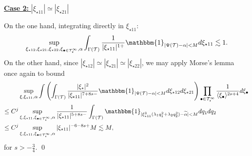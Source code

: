 \documentclass[%
11pt,  reqno]{amsart}
\newcommand{\5}{\textup{V}}
\newcommand{\noi}{\noindent}
\newcommand{\wt}{\widetilde}
\theoremstyle{remark}
\newcommand{\bul}{\bullet}
\newcommand{\TT}{\mathcal{T}}
\newcommand{\G}{\Gamma}
\newcommand{\ld}{\lambda}
\newcommand{\jb}[1]
{\langle #1 \rangle}
\numberwithin{equation}{section}
\numberwithin{theorem}{section}
\begin{document}
\smallskip
\noi
\underline{\textbf{Case 2:} $|\xi_{\star11}| \simeq |\xi_{\star21}|$}


 On the one hand, integrating directly in $\xi_{\star11}$:
\begin{align*} 
\sup_{\xi_{\star12}, \xi_{\star21}, \xi_{\star22},  \xi_{\bul\in \TT^\infty_\star},\alpha} \int_{\G(\TT)}\frac{1}{|\xi_{\star11}|^{1+}}\mathbbm{1}_{|\Psi(\TT)-\alpha|<M} d\xi_{\star11} \lesssim 1
.
\end{align*}
On the other hand, since $|\xi_{\star12}|\simeq |\xi_{\star21}|\simeq |\xi_{\star22}|$, we may apply Morse's lemma once again to bound
\begin{align}
&
\sup_{\xi, \xi_{\star11},\alpha} 
\int \left(\int_{\G(\TT)} \frac{|\xi_\star|^2}{|\xi_{\star11}|^{7+8s - }}\mathbbm{1}_{|\Psi(\TT)-\alpha|<M} d\xi_{\star12} d\xi_{\star21} \right)
\prod_{\bul\in \TT^\infty_\star} \frac{1}{\jb{\xi_{\bul}}^{2s+4}} d\xi_\bul
\\
\le C^j
&
\sup_{\xi, \xi_{\star11}, \xi_{\bul\in \TT^\infty_\star},\alpha}
\frac{1}{|\xi_{\star11}|^{5+8s - }}
\int_{\G(\TT)} \mathbbm{1}_{|\xi_{\star11}^3(\ld_{1} q_1^2 + \ld_2 q_2^2)-\wt\alpha|<M} dq_1 dq_2\label{eq:L2_44}
\\
\le C^j 
&
\sup_{\xi, \xi_{\star11}, \xi_{\bul\in \TT^\infty_\star},\alpha} |\xi_{\star11}|^{-6-8s+}M \lesssim M, 
\end{align} 
for $s>-\frac34$.
\qed

\end{document}

